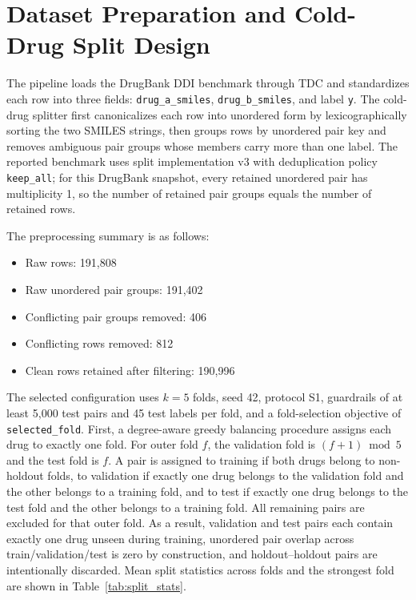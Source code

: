 \documentclass[12pt,a4paper]{report}
\begin{document}
\section{Dataset Preparation and Cold-Drug Split Design}
The pipeline loads the DrugBank DDI benchmark through TDC and standardizes each row into three fields: \texttt{drug\_a\_smiles}, \texttt{drug\_b\_smiles}, and label \texttt{y}. The cold-drug splitter first canonicalizes each row into unordered form by lexicographically sorting the two SMILES strings, then groups rows by unordered pair key and removes ambiguous pair groups whose members carry more than one label. The reported benchmark uses split implementation v3 with deduplication policy \texttt{keep\_all}; for this DrugBank snapshot, every retained unordered pair has multiplicity 1, so the number of retained pair groups equals the number of retained rows.

The preprocessing summary is as follows:
\begin{itemize}
    \item Raw rows: 191{,}808
    \item Raw unordered pair groups: 191{,}402
    \item Conflicting pair groups removed: 406
    \item Conflicting rows removed: 812
    \item Clean rows retained after filtering: 190{,}996
\end{itemize}

The selected configuration uses \(k=5\) folds, seed 42, protocol S1, guardrails of at least 5{,}000 test pairs and 45 test labels per fold, and a fold-selection objective of \texttt{selected\_fold}. First, a degree-aware greedy balancing procedure assigns each drug to exactly one fold. For outer fold \(f\), the validation fold is \((f+1)\bmod 5\) and the test fold is \(f\). A pair is assigned to training if both drugs belong to non-holdout folds, to validation if exactly one drug belongs to the validation fold and the other belongs to a training fold, and to test if exactly one drug belongs to the test fold and the other belongs to a training fold. All remaining pairs are excluded for that outer fold. As a result, validation and test pairs each contain exactly one drug unseen during training, unordered pair overlap across train/validation/test is zero by construction, and holdout--holdout pairs are intentionally discarded. Mean split statistics across folds and the strongest fold are shown in Table~\ref{tab:split_stats}.
\end{document}
